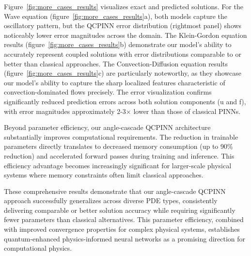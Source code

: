 Figure~\ref{fig:more_cases_results} visualizes exact and predicted solutions. For the Wave equation (figure~\ref{fig:more_cases_results}a), both models capture the oscillatory pattern, but the QCPINN error distribution (rightmost panel) shows noticeably lower error magnitudes across the domain. The Klein-Gordon equation results (figure~\ref{fig:more_cases_results}b) demonstrate our model's ability to accurately represent coupled solutions with error distributions comparable to or better than classical approaches.
The Convection-Diffusion equation results (figure~\ref{fig:more_cases_results}c) are particularly noteworthy, as they showcase our model's ability to capture the sharp localized features characteristic of convection-dominated flows precisely. The error visualization confirms significantly reduced prediction errors across both solution components (u and f), with error magnitudes approximately 2-3× lower than those of classical PINNs.

Beyond parameter efficiency, our angle-cascade QCPINN architecture substantially improves computational requirements. The reduction in trainable parameters directly translates to decreased memory consumption (up to 90\% reduction) and accelerated forward passes during training and inference. This efficiency advantage becomes increasingly significant for larger-scale physical systems where memory constraints often limit classical approaches.

These comprehensive results demonstrate that our angle-cascade QCPINN approach successfully generalizes across diverse PDE types, consistently delivering comparable or better solution accuracy while requiring significantly fewer parameters than classical alternatives. This parameter efficiency, combined with improved convergence properties for complex physical systems, establishes quantum-enhanced physics-informed neural networks as a promising direction for computational physics.
